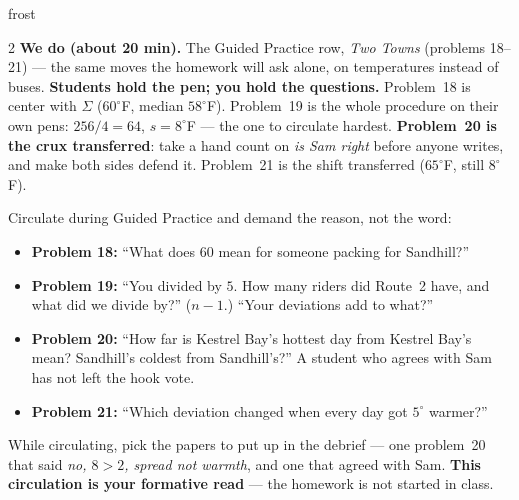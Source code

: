 \documentclass[10pt]{article}
\begin{document}
\begin{skillbox}{frost}
\begin{multicols}{2}
\columnbreak
\textbf{We do (about 20 min).} The Guided Practice row, \emph{Two Towns} (problems 18--21) ---
the same moves the homework will ask alone, on temperatures instead of buses.
\textbf{Students hold the pen; you hold the questions.} Problem~18 is center with $\Sigma$
($60^\circ$F, median $58^\circ$F). Problem~19 is the whole procedure on their own pens:
$256/4 = 64$, $s = 8^\circ$F --- the one to circulate hardest. \textbf{Problem~20 is the crux
transferred}: take a hand count on \emph{is Sam right} before anyone writes, and make both sides
defend it. Problem~21 is the shift transferred ($65^\circ$F, still $8^\circ$F).

Circulate during Guided Practice and demand the reason, not the word:
\begin{itemize}[leftmargin=1.1em, nosep]
  \item \textbf{Problem 18:} ``What does $60$ mean for someone packing for Sandhill?''
  \item \textbf{Problem 19:} ``You divided by $5$. How many riders did Route~2 have, and what
        did we divide by?'' ($n - 1$.) ``Your deviations add to what?''
  \item \textbf{Problem 20:} ``How far is Kestrel Bay's hottest day from Kestrel Bay's mean?
        Sandhill's coldest from Sandhill's?'' A student who agrees with Sam has not left the
        hook vote.
  \item \textbf{Problem 21:} ``Which deviation changed when every day got $5^\circ$ warmer?''
\end{itemize}
While circulating, pick the papers to put up in the debrief --- one problem~20 that said
\emph{no, $8 > 2$, spread not warmth}, and one that agreed with Sam. \textbf{This circulation is
your formative read} --- the homework is not started in class.
\end{multicols}
\end{skillbox}
\end{document}
